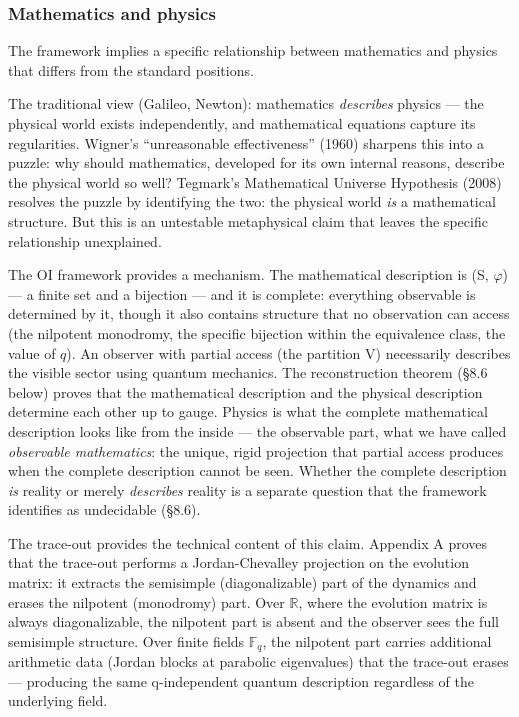 \documentclass[
  11pt,
]{article}
\begin{document}
\hypertarget{mathematics-and-physics}{%
\subsubsection{Mathematics and physics}\label{mathematics-and-physics}}

The framework implies a specific relationship between mathematics and
physics that differs from the standard positions.

The traditional view (Galileo, Newton): mathematics \emph{describes}
physics --- the physical world exists independently, and mathematical
equations capture its regularities. Wigner's ``unreasonable
effectiveness'' (1960) sharpens this into a puzzle: why should
mathematics, developed for its own internal reasons, describe the
physical world so well? Tegmark's Mathematical Universe Hypothesis
(2008) resolves the puzzle by identifying the two: the physical world
\emph{is} a mathematical structure. But this is an untestable
metaphysical claim that leaves the specific relationship unexplained.

The OI framework provides a mechanism. The mathematical description is
(S, \(\varphi\)) --- a finite set and a bijection --- and it is
complete: everything observable is determined by it, though it also
contains structure that no observation can access (the nilpotent
monodromy, the specific bijection within the equivalence class, the
value of \(q\)). An observer with partial access (the partition V)
necessarily describes the visible sector using quantum mechanics. The
reconstruction theorem (§8.6 below) proves that the mathematical
description and the physical description determine each other up to
gauge. Physics is what the complete mathematical description looks like
from the inside --- the observable part, what we have called
\emph{observable mathematics}: the unique, rigid projection that partial
access produces when the complete description cannot be seen. Whether
the complete description \emph{is} reality or merely \emph{describes}
reality is a separate question that the framework identifies as
undecidable (§8.6).

The trace-out provides the technical content of this claim. Appendix A
proves that the trace-out performs a Jordan-Chevalley projection on the
evolution matrix: it extracts the semisimple (diagonalizable) part of
the dynamics and erases the nilpotent (monodromy) part. Over
\(\mathbb{R}\), where the evolution matrix is always diagonalizable, the
nilpotent part is absent and the observer sees the full semisimple
structure. Over finite fields \(\mathbb{F}_q\), the nilpotent part
carries additional arithmetic data (Jordan blocks at parabolic
eigenvalues) that the trace-out erases --- producing the same
q-independent quantum description regardless of the underlying field.
\end{document}
